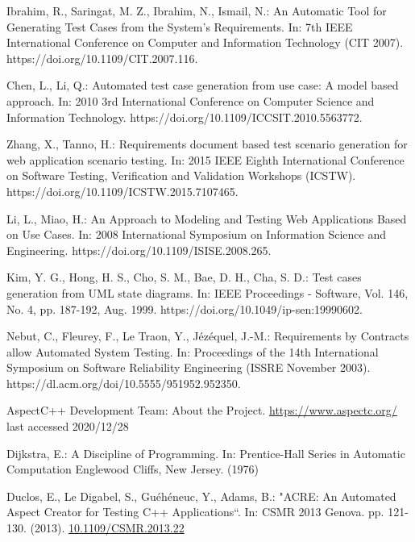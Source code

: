 \documentclass[a4paper,10pt, bibliography=totocnumbered]{scrreprt}
\begin{document}
\begin{thebibliography}{9}
 Ibrahim, R., Saringat, M. Z., Ibrahim, N., Ismail, N.: An Automatic Tool for Generating Test Cases from the System's Requirements.
In: 7th IEEE International Conference on Computer and Information Technology (CIT 2007).
https://doi.org/10.1109/CIT.2007.116.

 Chen, L., Li, Q.: Automated test case generation from use case: A model based approach.
In: 2010 3rd International Conference on Computer Science and Information Technology.
https://doi.org/10.1109/ICCSIT.2010.5563772.

 Zhang, X., Tanno, H.: Requirements document based test scenario generation for web application scenario testing.
In: 2015 IEEE Eighth International Conference on Software Testing, Verification and Validation Workshops (ICSTW).
https://doi.org/10.1109/ICSTW.2015.7107465.

 Li, L., Miao, H.: An Approach to Modeling and Testing Web Applications Based on Use Cases.
In: 2008 International Symposium on Information Science and Engineering.
https://doi.org/10.1109/ISISE.2008.265.

 Kim, Y. G., Hong, H. S., Cho, S. M., Bae, D. H., Cha, S. D.: Test cases generation from UML state diagrams.
In: IEEE Proceedings - Software, Vol. 146, No. 4, pp. 187-192, Aug. 1999.
https://doi.org/10.1049/ip-sen:19990602.

 Nebut, C., Fleurey, F., Le Traon, Y., Jézéquel, J.-M.: Requirements by Contracts allow Automated System Testing.
In: Proceedings of the 14th International Symposium on Software Reliability Engineering (ISSRE November 2003).
https://dl.acm.org/doi/10.5555/951952.952350.



 AspectC++ Development Team: About the Project.
\url{https://www.aspectc.org/} last accessed 2020/12/28

 Dijkstra, E.: A Discipline of Programming.
In: Prentice-Hall Series in Automatic Computation Englewood Cliffs, New Jersey. (1976)

 Duclos, E., Le Digabel, S., Guéhéneuc, Y.,  Adams, B.: "ACRE: An Automated Aspect Creator for Testing C++ Applications“.
In:  CSMR 2013 Genova.  pp. 121-130. (2013). \url{10.1109/CSMR.2013.22}


\end{thebibliography}
\end{document}
